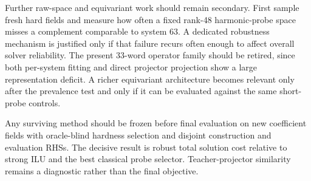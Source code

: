 Further raw-space and equivariant work should remain secondary. First sample fresh hard fields and measure how often a fixed rank-48 harmonic-probe space misses a complement comparable to system 63. A dedicated robustness mechanism is justified only if that failure recurs often enough to affect overall solver reliability. The present 33-word operator family should be retired, since both per-system fitting and direct projector projection show a large representation deficit. A richer equivariant architecture becomes relevant only after the prevalence test and only if it can be evaluated against the same short-probe controls.

Any surviving method should be frozen before final evaluation on new coefficient fields with oracle-blind hardness selection and disjoint construction and evaluation RHSs. The decisive result is robust total solution cost relative to strong ILU and the best classical probe selector. Teacher-projector similarity remains a diagnostic rather than the final objective.
